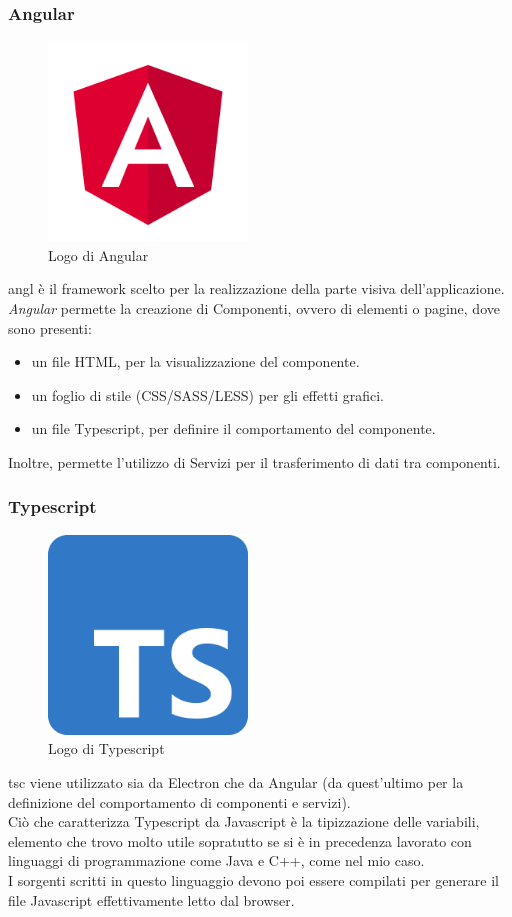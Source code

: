 \subsubsection{Angular}
\begin{figure}[h]
    \centering
    \includegraphics[width=150pt]{images/technologies/angular.png}
    \caption{Logo di Angular}
    \label{fig:angular}
\end{figure}
\gls{angl} è il framework scelto per la realizzazione della parte visiva dell'applicazione.\\
\emph{Angular} permette la creazione di Componenti, ovvero di elementi o pagine, dove sono presenti:
\begin{itemize}
    \item un file HTML, per la visualizzazione del componente.
    \item un foglio di stile (CSS/SASS/LESS) per gli effetti grafici.
    \item un file Typescript, per definire il comportamento del componente.
\end{itemize}
Inoltre, permette l'utilizzo di Servizi per il trasferimento di dati tra componenti.
\subsubsection{Typescript}
\begin{figure}[h]
    \centering
    \includegraphics[width=150pt]{images/technologies/typescript.png}
    \caption{Logo di Typescript}
    \label{fig:typescript}
\end{figure}
\gls{tsc} viene utilizzato sia da Electron che da Angular (da quest'ultimo per la definizione del comportamento di componenti e servizi).\\
Ciò che caratterizza Typescript da Javascript è la tipizzazione delle variabili, elemento che trovo molto utile sopratutto se si è in precedenza lavorato con linguaggi di programmazione come Java e C++, come nel mio caso.\\
I sorgenti scritti in questo linguaggio devono poi essere compilati per generare il file Javascript effettivamente letto dal browser.

